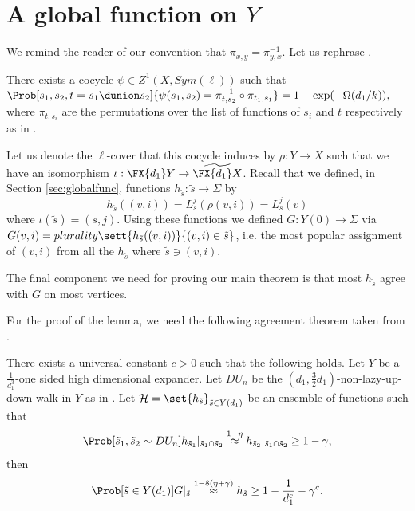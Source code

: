 \section[A global function on Y]{A global function on \(Y\)} \label{sec:global-func}
We remind the reader of our convention that \(\pi_{x,y}=\pi_{y,x}^{-1}\).
Let us rephrase .
\begin{lemma} \label{lem:good-exact-cover}
    There exists a cocycle \(\psi \in Z^1(X,Sym(\ell))\) such that \(\Prob[s_1,s_2, t=s_1 \dunion s_2]{\psi(s_1, s_2)=\pi_{t,s_2}^{-1} \circ \pi_{t_1,s_1} } = 1-\exp(-\Omega(d_1/k)),\) where \(\pi_{t,s_i}\) are the permutations over the list of functions of \(s_i\) and \(t\) respectively as in .
\end{lemma}
Let us denote the \(\ell\)-cover that this cocycle induces by \(\rho:Y\to X\) such that we have an isomorphism $\iota:\FX{d_1}Y\to\widetilde{\FX{d_1}X}$. 
Recall that we defined, in Section \ref{sec:globalfunc},
functions \(h_{\tilde{s}}:\tilde{s} \to \Sigma\) by
\begin{equation}
    h_{\tilde{s}}((v,i))=L_s^j(\rho(v,i))=L_s^j(v)
\end{equation}
where \(\iota(\tilde{s})=(s,j)\). Using these functions we defined \(G:Y(0) \to \Sigma\) via \(G(v,i)=plurality \sett{ h_{\tilde{s}}((v,i))}{(v,i) \in \tilde{s}}\), i.e. the most popular assignment of \((v,i)\) from all the \(h_{\tilde{s}}\) where \(\tilde{s} \ni (v,i)\).

The final component we need for proving our main theorem is that most \(h_{\tilde{s}}\) agree with \(G\) on most vertices.

For the proof of the lemma, we need the following agreement theorem taken from \cite{DiksteinH2023}.
\begin{theorem}\label{thm:agreement-high-acceptance}
    There exists a universal constant \(c>0\) such that the following holds. Let \(Y\) be a \(\frac{1}{d_1^3}\)-one sided high dimensional expander. Let \(DU_n\) be the \((d_1,\frac{3}{2}d_1)\)-non-lazy-up-down walk in \(Y\) as in . Let \(\mathcal{H}=\set{h_{\tilde{s}}}_{\tilde{s} \in Y(d_1)}\) be an ensemble of functions such that
    \[\Prob[\tilde{s}_1,\tilde{s}_2 \sim DU_n]{h_{\tilde{s}_1}|_{\tilde{s}_1 \cap \tilde{s}_2} \overset{1-\eta}{\approx} h_{\tilde{s}_2}|_{\tilde{s}_1 \cap \tilde{s}_2} } \geq 1-\gamma,\]
    then 
    \[\Prob[\tilde{s} \in Y(d_1)]{G|_{\tilde{s}} \overset{1-8(\eta + \gamma)}{\approx} h_{\tilde{s}}} \geq 1-\frac{1}{d_1^c}-\gamma^c.\]
\end{theorem}

